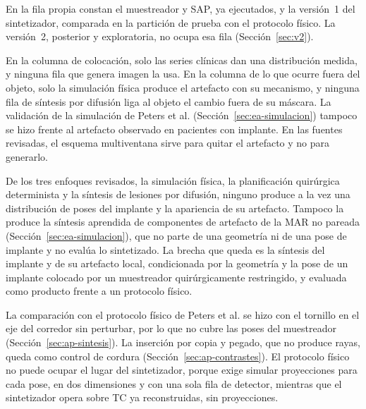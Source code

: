 En la fila propia constan el muestreador y SAP, ya ejecutados, y la versión~1 del sintetizador, comparada en la partición de prueba con el protocolo físico.   La versión~2, posterior y exploratoria, no ocupa esa fila (Sección~\ref{sec:v2}).

En la columna de colocación, solo las series clínicas dan una distribución medida, y ninguna fila que genera imagen la usa. En la columna de lo que ocurre fuera del objeto, solo la simulación física produce el artefacto con su mecanismo, y ninguna fila de síntesis por difusión liga al objeto el cambio fuera de su máscara. La validación de la simulación de Peters et al. (Sección~\ref{sec:ea-simulacion}) tampoco se hizo frente al artefacto observado en pacientes con implante. En las fuentes revisadas, el esquema multiventana sirve para quitar el artefacto y no para generarlo.

De los tres enfoques revisados, la simulación física, la planificación quirúrgica determinista y la síntesis de lesiones por difusión, ninguno produce a la vez una distribución de poses del implante y la apariencia de su artefacto. Tampoco la produce la síntesis aprendida de componentes de artefacto de la MAR no pareada (Sección~\ref{sec:ea-simulacion}), que no parte de una geometría ni de una pose de implante y no evalúa lo sintetizado. La brecha que queda es la síntesis del implante y de su artefacto local, condicionada por la geometría y la pose de un implante colocado por un muestreador quirúrgicamente restringido, y evaluada como producto frente a un protocolo físico.

La comparación con el protocolo físico de Peters et al. se hizo con el tornillo en el eje del corredor sin perturbar, por lo que no cubre las poses del muestreador (Sección~\ref{sec:ap-sintesis}). La inserción por copia y pegado, que no produce rayas, queda como control de cordura (Sección~\ref{sec:ap-contrastes}). El protocolo físico no puede ocupar el lugar del sintetizador, porque exige simular proyecciones para cada pose, en dos dimensiones y con una sola fila de detector, mientras que el sintetizador opera sobre TC ya reconstruidas, sin proyecciones.

